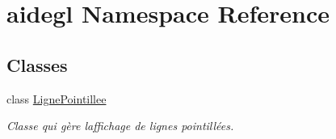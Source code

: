 \hypertarget{namespaceaidegl}{}\section{aidegl Namespace Reference}
\label{namespaceaidegl}
\subsection*{Classes}
\begin{DoxyCompactItemize}
\item 
class \hyperlink{classaidegl_1_1_ligne_pointillee}{Ligne\+Pointillee}
\begin{DoxyCompactList}\small\item\em Classe qui gère l\textquotesingle{}affichage de lignes pointillées. \end{DoxyCompactList}\end{DoxyCompactItemize}
